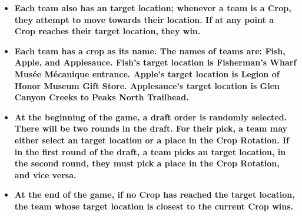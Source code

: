 \documentclass{article}
\begin{document}
\begin{itemize}
    \item \textbf{Each team also has an target location; whenever a team is a Crop, they attempt to move towards their location. If at any point a Crop reaches their target location, they win.}
    \item \textbf{Each team has a crop as its name. The names of teams are: Fish, Apple, and Applesauce. Fish's target location is Fisherman's Wharf Musée Mécanique entrance. Apple's target location is Legion of Honor Museum Gift Store. Applesauce's target location is Glen Canyon Creeks to Peaks North Trailhead. }
    \item \textbf{At the beginning of the game, a draft order is randomly selected. There will be two rounds in the draft. For their pick, a team may either select an target location or a place in the Crop Rotation. If in the first round of the draft, a team picks an target location, in the second round, they must pick a place in the Crop Rotation, and vice versa.}
    \item \textbf{At the end of the game, if no Crop has reached the target location, the team whose target location is closest to the current Crop wins.}
\end{itemize}
\end{document}
